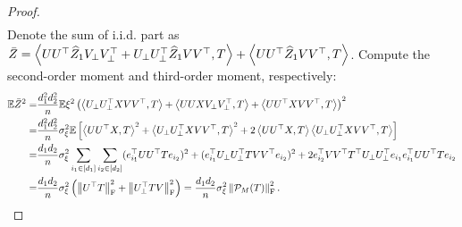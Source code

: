 \documentclass[12pt]{article}
\newcommand{\tF}{{\rm F}}
\newcommand{\norm}[1]{\left\lVert#1\right\rVert}
\newcommand{\E}{\mathbb{E}}
\newcommand{\cP}{\mathcal{P}}
\theoremstyle{plain}
\begin{document}
\begin{proof}
\begin{equation}
\begin{aligned}
\end{aligned}  
\end{equation}
Denote the sum of i.i.d. part as $\Bar{Z}=\left\langle U U^\top \widehat{Z}_1 V_{\perp} V_{\perp}^\top + U_{\perp} U^\top_{\perp} \widehat{Z}_1 VV^\top, T \right\rangle + \left\langle UU^\top \widehat{Z}_1VV^\top, T\right\rangle$. Compute the second-order moment and third-order moment, respectively:
\begin{equation*}
    \begin{aligned}
        \E \Bar{Z}^2 = & \frac{d_1^2d_2^2}{n}\E \xi^2 \left(\left\langle U_{\perp} U_{\perp}^{\top} X V V^{\top}, T\right\rangle+\left\langle U U X V_{\perp} V_{\perp}^{\top}, T\right\rangle + \left\langle UU^{\top} X V V^{\top}, T\right\rangle \right)^2 \\
        = & \frac{d_1^2d_2^2}{n}\sigma_{\xi}^2 \E  \left[\left\langle UU^{\top} X, T\right\rangle^2 +\left\langle U_{\perp} U_{\perp}^{\top} X VV^\top, T\right\rangle^2 + 2 \left\langle UU^{\top} X, T\right\rangle \left\langle U_{\perp} U_{\perp}^{\top} X VV^\top, T\right\rangle\right]\\
        = & \frac{d_1d_2}{n}\sigma_{\xi}^2 \sum_{i_1\in [d_1] }\sum_{i_2\in [d_2] } (e_{i_1}^\top U U^\top T e_{i_2} )^2 + (e_{i_1}^\top U_{\perp} U^\top_{\perp} TVV^\top e_{i_2} )^2 + 2 e_{i_2}^\top VV^\top T^\top U_{\perp} U^\top_{\perp}e_{i_1}  e_{i_1}^\top U U^\top T e_{i_2} \\
        = & \frac{d_1d_2}{n}\sigma_{\xi}^2 \left(\norm{U^\top T}_{\tF}^2 + \norm{U^\top_{\perp} TV }^2_{\tF} \right) = \frac{d_1d_2}{n}\sigma_{\xi}^2 \norm{\cP_M(T) }_\tF^2.
    \end{aligned}
\end{equation*}


\end{proof}
\end{document}
